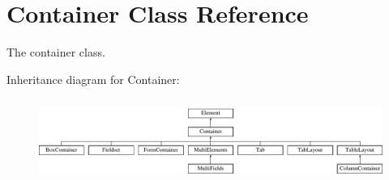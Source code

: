 \hypertarget{class_container}{
\section{Container Class Reference}
\label{class_container}
}


The container class.  


Inheritance diagram for Container:\begin{figure}[H]
\begin{center}
\leavevmode
\includegraphics[height=2.735043cm]{class_container}
\end{center}
\end{figure}
